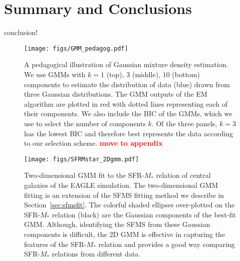 \documentclass[preprint2,tighten]{aastex62}
\newcommand{\todo}[1]{{\bf \textcolor{red}{ #1}}}
\begin{document}

\section{Summary and Conclusions} \label{sec:summary}
conclusion!

\appendix
\begin{figure}
\begin{center}
\texttt{[image: figs/GMM\_pedagog.pdf]} 
\caption{A pedagogical illustration of Gaussian mixture density estimation. 
We use GMMs with $k = 1$ (top), $3$ (middle), $10$ (bottom) components to estimate 
the distribution of data (blue) drawn from three Gaussian distributions. The GMM 
outputs of the EM algorithm are plotted in red with dotted lines representing each 
of their components. We also include the BIC of the GMMs, which we use to select 
the number of components $k$. Of the three panels, $k=3$ has the lowest BIC and 
therefore best represents the data according to our selection 
scheme. \todo{move to appendix}} \label{fig:gmm_pedagog}
\end{center}
\end{figure}

\begin{figure*}
\begin{center}
\texttt{[image: figs/SFRMstar\_2Dgmm.pdf]} 
\caption{Two-dimensional GMM fit to the SFR-$M_*$ relation of central galaxies
of the EAGLE simulation. The two-dimensional GMM fitting is an extension of the 
SFMS fitting method we describe in Section~\ref{sec:sfmsfit}. The colorful shaded
ellipses over-plotted on the SFR-$M_*$ relation (black) are the Gaussian components 
of the best-fit GMM. Although, identifying the SFMS from these Gaussian components
is difficult, the 2D GMM is effective in capturing the features of the SFR-$M_*$ 
relation and provides a good way comparing SFR-$M_*$ relations from different data.
} \label{fig:2dgmm}
\end{center}
\end{figure*}
\end{document}
